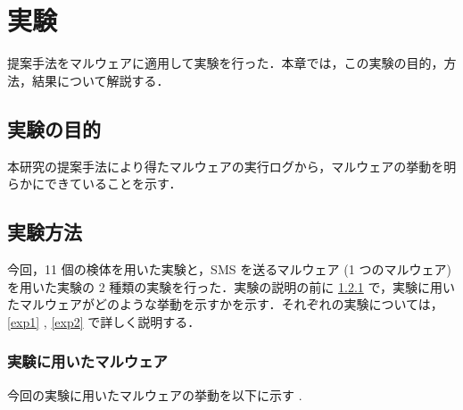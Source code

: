 \section{実験}
\label{sec:exp}
提案手法をマルウェアに適用して実験を行った．本章では，この実験の目的，方法，結果について解説する．
\subsection{実験の目的}
本研究の提案手法により得たマルウェアの実行ログから，マルウェアの挙動を明らかにできていることを示す．

\subsection{実験方法}
今回，11 個の検体を用いた実験と，SMS を送るマルウェア (1 つのマルウェア)を用いた実験の 2 種類の実験を行った．実験の説明の前に \ref{expmalware} で，実験に用いたマルウェアがどのような挙動を示すかを示す．それぞれの実験については， \ref{exp1} , \ref{exp2} で詳しく説明する．

\subsubsection{実験に用いたマルウェア}
\label{expmalware}
今回の実験に用いたマルウェアの挙動を以下に示す \cite{golddream} \cite{basebridge} \cite{droiddreamlight} \cite{crazyapp} \cite{icalendar} \cite{snake} \cite{trojan} .

